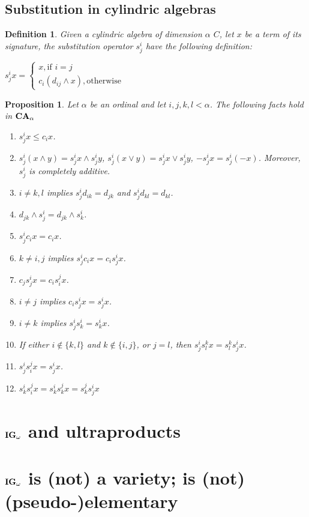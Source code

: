 \documentclass[a4paper]{article}
\theoremstyle{defin}
\newtheorem{defin}{Definition}
\theoremstyle{theorem}
\theoremstyle{prop}
\newtheorem{prop}{Proposition}
\theoremstyle{lemma}
\theoremstyle{ex}
\theoremstyle{col}
\begin{document}
\subsection{Substitution in cylindric algebras}

\begin{defin}
  Given a cylindric algebra of dimension $\alpha$ $C$, let $x$ be a term of its signature, the substitution operator $s^{i}_{j}$ have the following definition:
  \begin{center}
  $s^{i}_{j} x = \begin{cases} x, \text{if } i = j \\ c_i (d_{ij} \land x), \text{otherwise} \end{cases}$
  \end{center}
\end{defin}

\begin{prop} Let $\alpha$ be an ordinal and let $i, j, k, l < \alpha$. The following facts hold in ${\bf CA}_{\alpha}$

  \begin{enumerate}
    \item $s^{i}_j x \leq c_i x$.
    \item $s^{i}_j (x \land y) = s^{i}_j x \land s^{i}_j y$, $s^{i}_j (x \lor y) = s^{i}_j x \lor s^{i}_j y$, $- s^{i}_j x = s^{i}_j (- x)$.
    Moreover, $s^{i}_j$ is completely additive.
    \item $i \neq k, l$ implies $s^i_j d_{ik} = d_{jk}$ and $s^i_j d_{kl} = d_{kl}$.
    \item $d_{jk} \land s^{i}_j = d_{jk} \land s^{i}_k$.
    \item $s^i_j c_i x = c_i x$.
    \item $k \neq i,j$ implies $s^i_j c_i x = c_i s^i_j x$.
    \item $c_j s^i_j x = c_i s^j_i x$.
    \item $i \neq j$ implies $c_i s^i_j x = s^i_j x$.
    \item $i \neq k$ implies $s^i_j s^i_k = s^i_k x$.
    \item If either $i \notin \{ k, l\}$ and $k \notin \{ i, j\}$, or $j = l$, then $s^i_j s^k_l x = s^k_l s^i_j x$.
    \item $s^i_j s^j_i x = s^i_j x$.
    \item $s^i_k s^j_i x = s^i_k s^j_k x = s^j_k s^i_j x$
  \end{enumerate}
\end{prop}

\section{${\bf IG}_{\omega}$ and ultraproducts}

\section{${\bf IG}_{\omega}$ is (not) a variety; is (not) (pseudo-)elementary}



\end{document}
